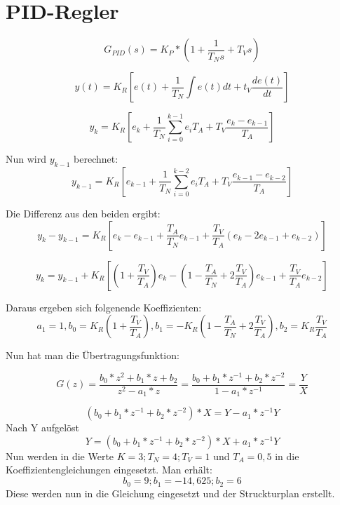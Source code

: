 \documentclass[12pt,a4paper]{report}
\begin{document}
\chapter{PID-Regler}
\begin{equation}
G_{PID}(s) = K_P*\left( 1+ \frac{1}{T_Ns} + T_Vs \right)
\end{equation}

\begin{equation}
y(t) = K_R \left[e(t) +\frac{1}{T_N}\int e(t) dt+ t_V \frac{de(t)}{dt}\right]
\end{equation}

\begin{equation}
y_k = K_R \left[e_k +\frac{1}{T_N}\sum_{i=0}^{k-1}e_iT_A+ T_V \frac{e_k-e_{k-1}}{T_A}\right]
\end{equation}

Nun wird $y_{k-1}$ berechnet:
\begin{equation}
y_{k-1} = K_R \left[e_{k-1} +\frac{1}{T_N}\sum_{i=0}^{k-2}e_iT_A+ T_V \frac{e_{k-1}-e_{k-2}}{T_A}\right]
\end{equation}

Die Differenz aus den beiden ergibt:
\begin{equation}
y_k-y_{k-1} = K_R \left[e_k-e_{k-1} 
+\frac{T_A}{T_N}e_{k-1}
+ \frac{T_V}{T_A}(e_k-2e_{k-1}+e_{k-2})\right]
\end{equation}

\begin{equation}
y_k = y_{k-1}+ K_R \left[
\left(1+\frac{T_V}{T_A}\right)e_k 
-\left(1-\frac{T_A}{T_N}+2\frac{T_V}{T_A}\right)e_{k-1}
+ \frac{T_V}{T_A}e_{k-2}
\right]
\end{equation}

Daraus ergeben sich folgenende Koeffizienten:
\begin{equation}
a_1 = 1, b_0 = K_R\left(1+\frac{T_V}{T_A}\right),
b_1 = -K_R \left(1-\frac{T_A}{T_N}+2\frac{T_V}{T_A}\right),
b_2 = K_R \frac{T_V}{T_A}
\end{equation}

Nun hat man die Übertragungsfunktion:

\begin{equation}
G(z)= \frac{b_0*z^2+b_1*z+b_2}{z^2-a_1*z} = \frac{b_0+b_1*z^{-1}+b_2*z^{-2}}{1-a_1*z^{-1}} = \frac{Y}{X}
\end{equation}

\begin{equation}
	(b_0+b_1*z^{-1}+b_2*z^{-2})*X= Y-a_1*z^{-1}Y
\end{equation}
Nach Y aufgelöst
\begin{equation}
Y= 	(b_0+b_1*z^{-1}+b_2*z^{-2})*X + a_1*z^{-1}Y
\end{equation}
Nun werden in die Werte $K=3; T_N=4; T_V= 1 $ und $T_A = 0,5$ in die Koeffizientengleichungen eingesetzt. Man erhält:
\begin{equation}
b_0 = 9; b_1 = -14,625; b_2= 6
\end{equation} Diese werden nun in die Gleichung eingesetzt und der Struckturplan erstellt.\\
\end{document}
